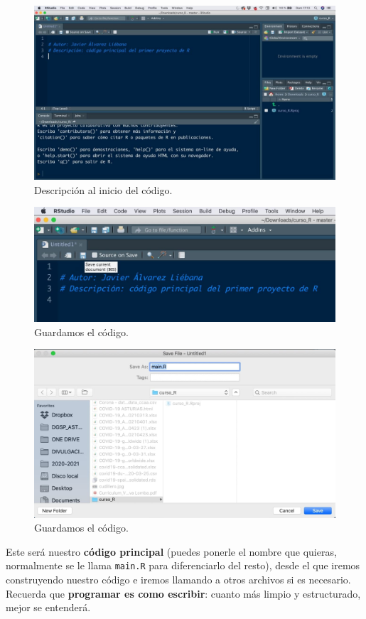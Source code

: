 \documentclass[11pt,]{book}
\begin{document}
\begin{figure}

{\centering \includegraphics[width=0.5\linewidth]{./img/crear_proyecto6} 

}

\caption{Descripción al inicio del código.}\label{fig:crear-proyecto6}
\end{figure}

\begin{figure}

{\centering \includegraphics[width=0.5\linewidth]{./img/crear_proyecto7} 

}

\caption{Guardamos el código.}\label{fig:crear-proyecto7}
\end{figure}

\begin{figure}

{\centering \includegraphics[width=0.5\linewidth]{./img/crear_proyecto8} 

}

\caption{Guardamos el código.}\label{fig:crear-proyecto8}
\end{figure}

Este será nuestro \textbf{código principal} (puedes ponerle el nombre que quieras, normalmente se le llama \texttt{main.R} para diferenciarlo del resto), desde el que iremos construyendo nuestro código e iremos llamando a otros archivos si es necesario. Recuerda que \textbf{programar es como escribir}: cuanto más limpio y estructurado, mejor se entenderá.
\end{document}
